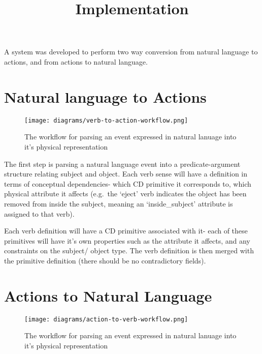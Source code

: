 \documentclass{article}
\title{Implementation}
\begin{document}
    \maketitle

    A system was developed to perform two way conversion from natural language to actions, and from actions to natural language.

    \section{Natural language to Actions}
    \begin{figure}
        \begin{center}        
            \texttt{[image: diagrams/verb-to-action-workflow.png]}
        \end{center}
        \caption{The workflow for parsing an event expressed in natural lanuage into it's physical representation}
    \end{figure}

    The first step is parsing a natural language event into a predicate-argument structure relating subject and object. Each verb sense will have a definition in terms of conceptual dependencies- which CD primitive it corresponds to, which physical attribute it affects (e.g.~the `eject' verb indicates the object has been removed from inside the subject, meaning an `inside\_subject' attribute is assigned to that verb).

    Each verb definition will have a CD primitive associated with it- each of these primitives will have it's own properties such as the attribute it affects, and any constraints on the subject/ object type. The verb definition is then merged with the primitive definition (there should be no contradictory fields).
    
    \section{Actions to Natural Language}
    \begin{figure}
        \begin{center}        
            \texttt{[image: diagrams/action-to-verb-workflow.png]}
        \end{center}
        \caption{The workflow for parsing an event expressed in natural lanuage into it's physical representation}
    \end{figure}
\end{document}
